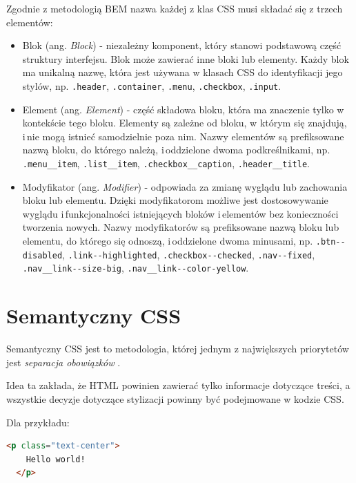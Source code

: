 \documentclass[a4paper,12pt]{book} %
\begin{document}
Zgodnie z metodologią BEM nazwa każdej z klas CSS musi składać się z trzech elementów:
\begin{itemize}
  \item Blok (ang. \emph{Block}) - niezależny komponent, który stanowi podstawową część struktury interfejsu. Blok może zawierać inne bloki lub elementy. Każdy blok ma unikalną nazwę, która jest używana w klasach CSS do identyfikacji jego stylów, np. \lstinline{.header}, \lstinline{.container}, \lstinline{.menu}, \lstinline{.checkbox}, \lstinline{.input}.

  \item Element (ang. \emph{Element}) - część składowa bloku, która ma znaczenie tylko w kontekście tego bloku. Elementy są zależne od bloku, w którym się znajdują, i\,nie mogą istnieć samodzielnie poza nim. Nazwy elementów są prefiksowane nazwą bloku, do którego należą, i\,oddzielone dwoma podkreślnikami, np. \lstinline{.menu__item}, \lstinline{.list__item}, \lstinline{.checkbox__caption}, \lstinline{.header__title}.

  \item Modyfikator (ang. \emph{Modifier}) - odpowiada za zmianę wyglądu lub zachowania bloku lub elementu. Dzięki modyfikatorom możliwe jest dostosowywanie wyglądu i\,funkcjonalności istniejących bloków i\,elementów bez konieczności tworzenia nowych. Nazwy modyfikatorów są prefiksowane nazwą bloku lub elementu, do którego się odnoszą, i\,oddzielone dwoma minusami, np. \lstinline{.btn--disabled}, \lstinline{.link--highlighted}, \lstinline{.checkbox--checked}, \lstinline{.nav--fixed}, \lstinline{.nav__link--size-big}, \lstinline{.nav__link--color-yellow}.
\end{itemize}





\section{Semantyczny CSS}
Semantyczny CSS jest to metodologia, której jednym z największych priorytetów jest \textit{separacja obowiązków} \cite{Wathan2017}.

Idea ta zakłada, że HTML powinien zawierać tylko informacje dotyczące treści, a\,wszystkie decyzje dotyczące stylizacji powinny być podejmowane w kodzie CSS.

Dla przykładu:
\begin{lstlisting}[language=HTML]
  <p class="text-center">
    Hello world!
  </p>
\end{lstlisting}
\end{document}
